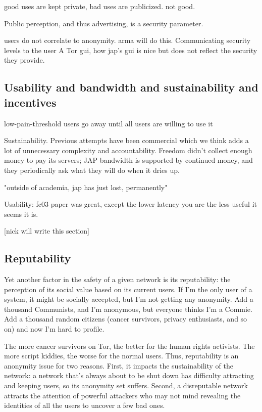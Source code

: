 \documentclass{llncs}
\begin{document}
good uses are kept private, bad uses are publicized. not good.

Public perception, and thus advertising, is a security parameter.

users do not correlate to anonymity. arma will do this.
Communicating security levels to the user
A Tor gui, how jap's gui is nice but does not reflect the security
they provide.

\subsection{Usability and bandwidth and sustainability and incentives}

low-pain-threshold users go away until all users are willing to use it

Sustainability. Previous attempts have been commercial which we think
adds a lot of unnecessary complexity and accountability. Freedom didn't
collect enough money to pay its servers; JAP bandwidth is supported by
continued money, and they periodically ask what they will do when it
dries up.

"outside of academia, jap has just lost, permanently"

Usability: fc03 paper was great, except the lower latency you are the
less useful it seems it is.

[nick will write this section]

\subsection{Reputability}

Yet another factor in the safety of a given network is its reputability:
the perception of its social value based on its current users. If I'm
the only user of a system, it might be socially accepted, but I'm not
getting any anonymity. Add a thousand Communists, and I'm anonymous,
but everyone thinks I'm a Commie. Add a thousand random citizens (cancer
survivors, privacy enthusiasts, and so on) and now I'm hard to profile.

The more cancer survivors on Tor, the better for the human rights
activists. The more script kiddies, the worse for the normal users. Thus,
reputability is an anonymity issue for two reasons. First, it impacts
the sustainability of the network: a network that's always about to be
shut down has difficulty attracting and keeping users, so its anonymity
set suffers. Second, a disreputable network attracts the attention of
powerful attackers who may not mind revealing the identities of all the
users to uncover a few bad ones.
\end{document}
